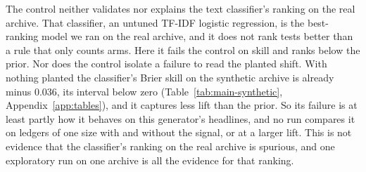The control neither validates nor explains the text classifier's ranking on the real archive. That classifier, an untuned TF-IDF logistic regression, is the best-ranking model we ran on the real archive, and it does not rank tests better than a rule that only counts arms. Here it fails the control on skill and ranks below the prior. Nor does the control isolate a failure to read the planted shift. With nothing planted the classifier's Brier skill on the synthetic archive is already minus 0.036, its interval below zero (Table~\ref{tab:main-synthetic}, Appendix~\ref{app:tables}), and it captures less lift than the prior. So its failure is at least partly how it behaves on this generator's headlines, and no run compares it on ledgers of one size with and without the signal, or at a larger lift. This is not evidence that the classifier's ranking on the real archive is spurious, and one exploratory run on one archive is all the evidence for that ranking.
